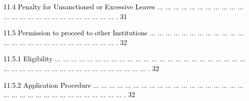 \documentclass[12pt]{article}
\begin{document}
\vspace{\baselineskip}
\begin{adjustwidth}{0.21in}{0.0in}
{\fontsize{7pt}{8.4pt}\selectfont \textcolor[HTML]{00000A}{11.4 Penalty for Unsanctioned or Excessive Leaves $ \ldots $ $ \ldots $ $ \ldots $ $ \ldots $ $ \ldots $ $ \ldots $ $ \ldots $ $ \ldots $ $ \ldots $ $ \ldots $ $ \ldots $ $ \ldots $ $ \ldots $ $ \ldots $ $ \ldots $ $ \ldots $ $ \ldots $ $ \ldots $ $ \ldots $ $ \ldots $ $ \ldots $ $ \ldots $ $ \ldots $ $ \ldots $ $ \ldots $ . 31}\par}\par

\end{adjustwidth}


\vspace{\baselineskip}
\begin{adjustwidth}{0.21in}{0.0in}
{\fontsize{7pt}{8.4pt}\selectfont \textcolor[HTML]{00000A}{11.5 Permission to proceed to other Institutions $ \ldots $ $ \ldots $ $ \ldots $ $ \ldots $ $ \ldots $ $ \ldots $ $ \ldots $ $ \ldots $ $ \ldots $ $ \ldots $ $ \ldots $ $ \ldots $ $ \ldots $ $ \ldots $ $ \ldots $ $ \ldots $ $ \ldots $ $ \ldots $ $ \ldots $ $ \ldots $ $ \ldots $ $ \ldots $ $ \ldots $ $ \ldots $ $ \ldots $ $ \ldots $ . 32}\par}\par

\end{adjustwidth}


\vspace{\baselineskip}
\begin{adjustwidth}{0.5in}{0.0in}
{\fontsize{7pt}{8.4pt}\selectfont \textcolor[HTML]{00000A}{11.5.1 Eligibility $ \ldots $ $ \ldots $ $ \ldots $ $ \ldots $ $ \ldots $ $ \ldots $ $ \ldots $ $ \ldots $ $ \ldots $ $ \ldots $ $ \ldots $ $ \ldots $ $ \ldots $ $ \ldots $ $ \ldots $ $ \ldots $ $ \ldots $ $ \ldots $ $ \ldots $ $ \ldots $ $ \ldots $ $ \ldots $ $ \ldots $ $ \ldots $ $ \ldots $ $ \ldots $ $ \ldots $ $ \ldots $ $ \ldots $ $ \ldots $ $ \ldots $ $ \ldots $ $ \ldots $ $ \ldots $ $ \ldots $ $ \ldots $ $ \ldots $ $ \ldots $ $ \ldots $ $ \ldots $ $ \ldots $ $ \ldots $ . 32}\par}\par

\end{adjustwidth}


\vspace{\baselineskip}
\begin{adjustwidth}{0.5in}{0.0in}
{\fontsize{7pt}{8.4pt}\selectfont \textcolor[HTML]{00000A}{11.5.2 Application Procedure $ \ldots $ $ \ldots $ $ \ldots $ $ \ldots $ $ \ldots $ $ \ldots $ $ \ldots $ $ \ldots $ $ \ldots $ $ \ldots $ $ \ldots $ $ \ldots $ $ \ldots $ $ \ldots $ $ \ldots $ $ \ldots $ $ \ldots $ $ \ldots $ $ \ldots $ $ \ldots $ $ \ldots $ $ \ldots $ $ \ldots $ $ \ldots $ $ \ldots $ $ \ldots $ $ \ldots $ $ \ldots $ $ \ldots $ $ \ldots $ $ \ldots $ $ \ldots $ $ \ldots $ $ \ldots $ . 32}\par}\par

\end{adjustwidth}
\end{document}
